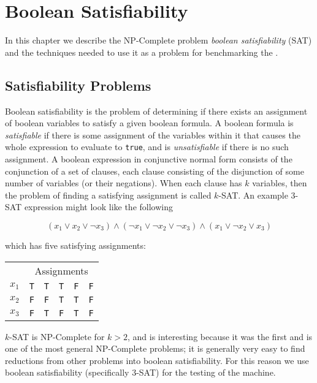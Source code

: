 \chapter{Boolean Satisfiability}
In this chapter we describe the NP-Complete problem \emph{boolean satisfiability} (SAT) and the techniques needed to use it as a problem for benchmarking the \machine.

\section{Satisfiability Problems}
Boolean satisfiability is the problem of determining if there exists an assignment of boolean variables to satisfy a given boolean formula.  A boolean formula is \emph{satisfiable} if there is some assignment of the variables within it that causes the whole expression to evaluate to \texttt{true}, and is \emph{unsatisfiable} if there is no such assignment.  
A boolean expression in conjunctive normal form consists of the conjunction of a set of clauses, each clause consisting of the disjunction of some number of variables (or their negations).  When each clause has $k$ variables, then the problem of finding a satisfying assignment is called $k$-SAT.  An example 3-SAT expression might look like the following

\begin{equation}
	(x_1 \vee x_2 \vee \neg x_3) \wedge (\neg x_1 \vee \neg x_2 \vee \neg x_3) \wedge (x_1 \vee \neg x_2 \vee x_3)
\end{equation}

which has five satisfying assignments:

\begin{center}
\begin{tabular}{l || l | l | l | l | l}
	\multicolumn{1}{l}{} & \multicolumn{5}{c}{Assignments} \\
	$x_1$ & \texttt{T} & \texttt{T} & \texttt{T} & \texttt{F} & \texttt{F} \\
	$x_2$ & \texttt{F} & \texttt{F} & \texttt{T} & \texttt{T} & \texttt{F} \\
	$x_3$ & \texttt{F} & \texttt{T} & \texttt{F} & \texttt{T} & \texttt{F} \\
\end{tabular}
\end{center}

$k$-SAT is NP-Complete\cite{sat} for $k > 2$, and is interesting because it was the first and is one of the most general NP-Complete problems; it is generally very easy to find reductions from other problems into boolean satisfiability.  For this reason we use boolean satisfiability (specifically 3-SAT) for the testing of the \machine machine.

